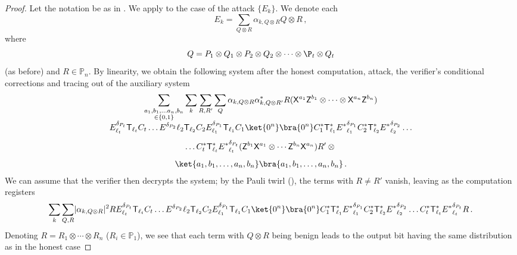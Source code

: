 \documentclass{toc}
\newcommand{\tgate}{{\sf T}}
\newcommand{\xgate}{{\sf X}}
\newcommand{\zgate}{{\sf Z}}
\providecommand{\abs}[1]{\lvert#1\rvert}
\newcommand{\ketbra}[2]{\ket{#1}\bra{#2}}			%
\newcommand{\egoketbra}[1]{\ketbra{#1}{#1}}			%
\begin{document}
\begin{proof}
Let the notation be as in .
We apply  to the case of the attack $\{E_k\}$. We denote each
\begin{equation}
  E_k = \sum_{Q\otimes R} \alpha_{k,Q \otimes R} Q\otimes R\,,
\end{equation}
where
\begin{equation}
  Q=P_1\otimes Q_1 \otimes P_2 \otimes Q_2 \otimes \cdots \otimes \P_t
  \otimes Q_t
\end{equation}
(as before) and $R \in \mathbb{P}_n$. By linearity, we obtain the
following system after the honest computation, attack, the verifier's
conditional corrections and tracing out of the auxiliary system%
\begin{multline}
\sum_{\substack{a_1,b_1, \ldots a_n, b_n \\ \in \{0,1\}}} \sum_k \sum_{R,R'} \sum_{Q} \alpha_{k,Q \otimes R} \alpha^*_{k,Q\otimes R'}
R  (\xgate^{a_1}\zgate^{b_1} \otimes \cdots \otimes \xgate^{a_n}\zgate^{b_n})\\[-1ex]
   E^{\delta_{P_t}}_{\ell_t}    \tgate_{\ell_t} C_t \ldots  E^{\delta_{P_2}}{\ell_2}    \tgate_{\ell_2} C_2  E^{\delta_{P_1}}_{\ell_1}  \tgate_{\ell_1} C_1 \ket{0^n}
   \bra{0^n} C_1^* \tgate^*_{\ell_1}   {E^*}^{\delta_{P_1}}_{\ell_1} C_2^*   \tgate^*_{\ell_2}   {E^*}^{\delta_{P_2}}_{\ell_2} \ldots\\[1ex]
   \ldots C_t^* \tgate^*_{\ell_t}   {E^*}^{\delta_{P_t}}_{\ell_t}
   (\zgate^{b_1} \xgate^{a_1}\otimes \cdots \zgate^{b_n} \xgate^{a_n})
 R' \otimes {}\\[1ex]
  \egoketbra{a_1, b_1, \ldots ,a_n, b_n}\,.
\end{multline}
We can assume that the verifier then decrypts the system; by the Pauli twirl (), the terms with $R \neq R'$ vanish, leaving as the computation registers%
\begin{multline}
 \sum_k \sum_{Q,R} \abs{\alpha_{k,Q\otimes R}}^2
R
   E^{\delta_{P_t}}_{\ell_t}    \tgate_{\ell_t} C_t \ldots  E^{\delta_{P_2}}{\ell_2}    \tgate_{\ell_2} C_2  E^{\delta_{P_1}}_{\ell_1}  \tgate_{\ell_1} C_1 \ket{0^n}
 \bra{0^n} C_1^* \tgate^*_{\ell_1}   {E^*}^{\delta_{P_1}}_{\ell_1} C_2^*   \tgate^*_{\ell_2}   {E^*}^{\delta_{P_2}}_{\ell_2} \ldots   C_t^* \tgate^*_{\ell_t}   {E^*}^{\delta_{P_t}}_{\ell_t}
   R\,.
\end{multline}
Denoting $R = R_1 \otimes \cdots \otimes R_n$ ($R_i \in \mathbb{P}_1$), we see that each term with $Q\otimes R$ being benign leads to the output bit having the same distribution as in the honest case

\end{proof}
\end{document}
